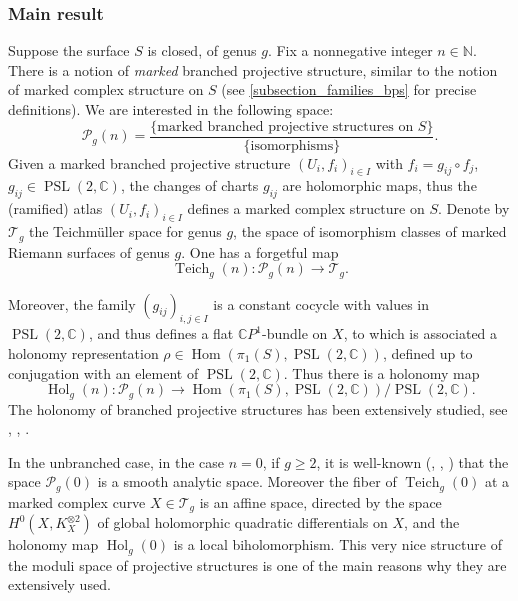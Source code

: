 \documentclass[JEP,XML,SOM,Unicode,NoEqCountersInSection,published]{cedram}
\newcommand{\C}{\mathbb C}
\newcommand{\N}{\mathbb N}
\newcommand{\CP}{\mathbb CP}
\DeclareMathOperator{\Hol}{Hol}
\DeclareMathOperator{\Hom}{Hom}
\DeclareMathOperator{\PSL}{PSL}
\DeclareMathOperator{\Teich}{Teich}
\theoremstyle{definition}
\theoremstyle{plain}
\begin{document}
\subsubsection*{Main result}

Suppose the surface $S$ is closed, of genus $g$.
Fix a nonnegative integer $n \in \N$.
There is a notion of \emph{marked} branched projective structure, similar to the notion of marked complex structure on $S$ (see \ref{subsection_families_bps} for precise definitions).
We are interested in the following space:
\begin{equation*}
\mathcal P_g(n) = \frac{\{\text{marked branched projective structures on $S$}\}}{\{\text{isomorphisms}\}}.
\end{equation*}
Given a marked branched projective structure $(U_i, f_i)_{i \in I}$ with $f_i = g_{ij} \circ f_j$, $g_{ij} \in \PSL(2, \C)$, the changes of charts $g_{ij}$ are holomorphic maps, thus the (ramified) atlas $(U_i, f_i)_{i \in I}$ defines a marked complex structure on $S$.
Denote by $\mathcal T_g$ the Teichmüller space for genus $g$, \ie the space of isomorphism classes of marked Riemann surfaces of genus $g$.
One has a forgetful map
\begin{equation*}
\Teich_g(n): \mathcal P_g(n) \to \mathcal T_g.
\end{equation*}

Moreover, the family $\left(g_{ij}\right)_{i, j \in I}$ is a constant cocycle with values in $\PSL(2, \C)$, and thus defines a flat $\CP^1$-bundle on $X$, to which is associated a holonomy representation $\rho \in \Hom(\pi_1(S), \PSL(2, \C))$, defined up to conjugation with an element of $\PSL(2, \C)$.
Thus there is a holonomy map
\begin{equation*}
\Hol_g(n): \mathcal P_g(n) \to \Hom(\pi_1(S), \PSL(2, \C)) / \PSL(2, \C).
\end{equation*}
The holonomy of branched projective structures has been extensively studied, see \cite{gallo-kapovich-marden}, \cite{calsamiglia-deroin-francaviglia}, \cite{le_fils}.

In the unbranched case, \ie in the case $n=0$, if $g \ge 2$, it is well-known (\cite{gunning}, \cite{hejhal}, \cite{hubbard}) that the space $\mathcal P_g(0)$ is a smooth analytic space.
Moreover the fiber of $\Teich_g(0)$ at a marked complex curve $X \in \mathcal T_g$ is an affine space, directed by the space $H^0\left(X, K_X^{\otimes 2}\right)$ of global holomorphic quadratic differentials on $X$, and the holonomy map $\Hol_g(0)$ is a local biholomorphism.
This very nice structure of the moduli space of projective structures is one of the main reasons why they are extensively used.
\end{document}
